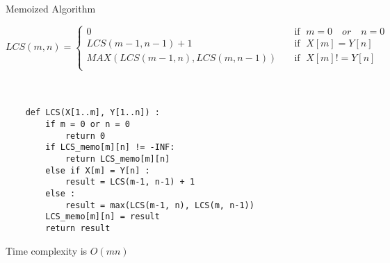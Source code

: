 \begin{frame}[fragile]{Memoized Algorithm}

\scriptsize{
   $
    LCS(m,n)=\begin{cases}
          0 \quad & \text{if }\; m = 0  \quad or \quad  n = 0 \\
           LCS(m-1, n-1) + 1  \quad & \text{if }\; X[m] = Y[n] \\
          MAX(LCS(m-1,n), LCS(m,n-1)) \quad &\text{if }\; X[m] != Y[n]  \\
     \end{cases}
$
}
\\~\
\\~\

\begin{multicols}{2}
\small{
    \begin{verbatim}
    def LCS(X[1..m], Y[1..n]) :
        if m = 0 or n = 0
            return 0
        if LCS_memo[m][n] != -INF:
            return LCS_memo[m][n]
        else if X[m] = Y[n] :
            result = LCS(m-1, n-1) + 1
        else :
            result = max(LCS(m-1, n), LCS(m, n-1))
        LCS_memo[m][n] = result
        return result
    \end{verbatim}}
    
\columnbreak
\pause 
\begin{tcolorbox}[colback=green!5,colframe=green!40!black]
     \textcolor{black!80}{ Time complexity is $O(mn)$} 
\end{tcolorbox}
\end{multicols}
\end{frame}

